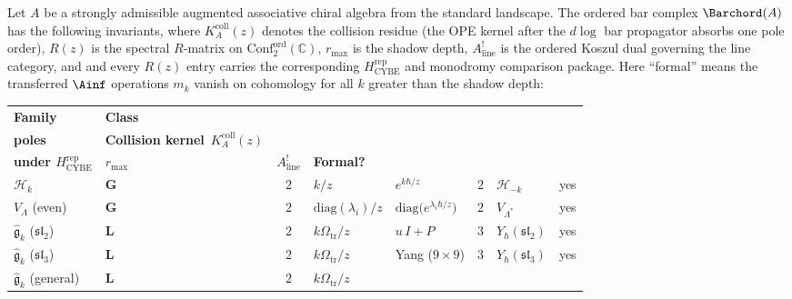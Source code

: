 \begin{theorem}%
\label{thm:e1-ordered-bar-landscape}%
%
%
%
Let\/ $A$ be a strongly admissible augmented associative chiral
algebra from the standard landscape. The ordered bar complex\/
$\Barchord(A)$ has the following invariants, where\/ $K_A^{\mathrm{coll}}(z)$
denotes the collision residue
\textup{(}the OPE kernel after the $d\log$ bar propagator
absorbs one pole order\textup{)},
$R(z)$ is the spectral $R$-matrix on
$\mathrm{Conf}_2^{\mathrm{ord}}(\mathbb{C})$,
$r_{\max}$ is the shadow depth,
$A^!_{\mathrm{line}}$ is the ordered Koszul dual governing the
line category, and
and every $R(z)$ entry carries the corresponding
$H_{\mathrm{CYBE}}^{\mathrm{rep}}$ and monodromy comparison package.
Here ``formal'' means the transferred $\Ainf$ operations
$m_k$ vanish on cohomology for all $k$ greater than the shadow depth:
\begin{center}
\small
\renewcommand{\arraystretch}{1.5}
\begin{tabular}{llcllcll}
\toprule
\textbf{Family}
 & \textbf{Class}
 & \makecell{\textbf{OPE} \\ \textbf{poles}}
 & \textbf{Collision kernel}~$K_A^{\mathrm{coll}}(z)$
 & \makecell{\textbf{represented $R$-matrix}\\\textbf{under $H_{\mathrm{CYBE}}^{\mathrm{rep}}$}}
 & $r_{\max}$
 & $A^!_{\mathrm{line}}$
 & \textbf{Formal?} \\
\midrule
$\mathcal{H}_k$
 & $\mathbf{G}$ & $2$
 & $k/z$
 & $e^{k\hbar/z}$
 & $2$
 & $\mathcal{H}_{-k}$\rlap{\textsuperscript{$\dagger$}}
 & yes \\[3pt]
$V_\Lambda$ \textup{(even)}
 & $\mathbf{G}$ & $2$
 & $\mathrm{diag}(\lambda_i)/z$
 & $\mathrm{diag}\bigl(e^{\lambda_i\hbar/z}\bigr)$
 & $2$
 & $V_{\Lambda^*}$\rlap{\textsuperscript{$\dagger$}}
 & yes \\[3pt]
$\widehat{\mathfrak{g}}_k$\; ($\mathfrak{sl}_2$)
 & $\mathbf{L}$ & $2$
 & $k\Omega_{\mathrm{tr}}/z$
 & $u\,I + P$
 & $3$
 & $Y_\hbar(\mathfrak{sl}_2)$
 & yes \\[3pt]
$\widehat{\mathfrak{g}}_k$\; ($\mathfrak{sl}_3$)
 & $\mathbf{L}$ & $2$
 & $k\Omega_{\mathrm{tr}}/z$
 & Yang ($9{\times}9$)
 & $3$
 & $Y_\hbar(\mathfrak{sl}_3)$
 & yes \\[3pt]
$\widehat{\mathfrak{g}}_k$\; (general)
 & $\mathbf{L}$ & $2$
 & $k\Omega_{\mathrm{tr}}/z$

\end{tabular}
\end{center}
\end{theorem}
